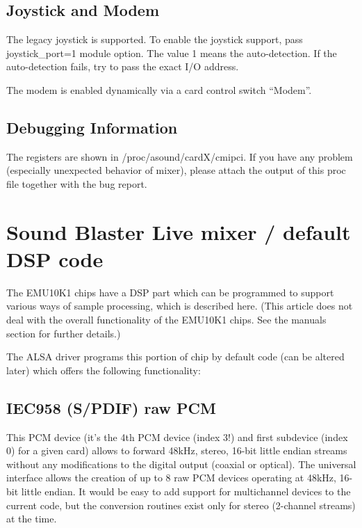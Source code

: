 \documentclass[a4paper,8pt,english]{sphinxmanual}
\begin{document}
\subsection{Joystick and Modem}
\label{sound/cards/cmipci:joystick-and-modem}
The legacy joystick is supported.  To enable the joystick support, pass
joystick\_port=1 module option.  The value 1 means the auto-detection.
If the auto-detection fails, try to pass the exact I/O address.

The modem is enabled dynamically via a card control switch ``Modem''.


\subsection{Debugging Information}
\label{sound/cards/cmipci:debugging-information}
The registers are shown in /proc/asound/cardX/cmipci.  If you have any
problem (especially unexpected behavior of mixer), please attach the
output of this proc file together with the bug report.


\section{Sound Blaster Live mixer / default DSP code}
\label{sound/cards/sb-live-mixer:sound-blaster-live-mixer-default-dsp-code}\label{sound/cards/sb-live-mixer::doc}
The EMU10K1 chips have a DSP part which can be programmed to support
various ways of sample processing, which is described here.
(This article does not deal with the overall functionality of the
EMU10K1 chips. See the manuals section for further details.)

The ALSA driver programs this portion of chip by default code
(can be altered later) which offers the following functionality:


\subsection{IEC958 (S/PDIF) raw PCM}
\label{sound/cards/sb-live-mixer:iec958-s-pdif-raw-pcm}
This PCM device (it's the 4th PCM device (index 3!) and first subdevice
(index 0) for a given card) allows to forward 48kHz, stereo, 16-bit
little endian streams without any modifications to the digital output
(coaxial or optical). The universal interface allows the creation of up
to 8 raw PCM devices operating at 48kHz, 16-bit little endian. It would
be easy to add support for multichannel devices to the current code,
but the conversion routines exist only for stereo (2-channel streams)
at the time.
\end{document}
